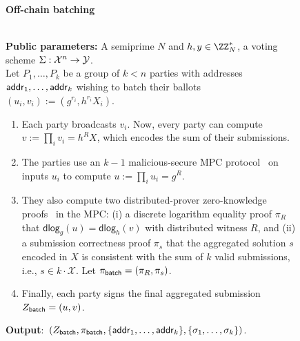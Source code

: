 \begin{figure}
    \centering
    \begin{mdframed}
    \begin{center}
        \textbf{Off-chain batching}
    \end{center}
    \hfill\\
    \textbf{Public parameters:} A semiprime $N$ and $h, y \in \ZZ_N^*$, a voting scheme $\Sigma : \mathcal{X}^n \rightarrow \mathcal{Y}$. \hfill\\
    \newline
    Let $P_1, \dots, P_{k}$ be a group of $k < n$ parties with addresses ${\sf addr}_1, \dots, {\sf addr}_{k}$ wishing to batch their ballots $(u_i, v_i) := (g^{r_i}, h^{r_i} X_i)$.
    \begin{enumerate}
        \item Each party broadcasts $v_i$. Now, every party can compute $v := \prod_i v_i = h^R X$, which encodes the sum of their submissions.
        \item The parties use an $k-1$ malicious-secure MPC protocol~\cite{ESORICS:DKLPSS13,CCS:Keller20} on inputs $u_i$ to compute $u := \prod_i u_i = g^R$.
        \item They also compute two distributed-prover zero-knowledge proofs~\cite{PoPETS:DPPSV22} in the MPC: (i) a discrete logarithm equality proof $\pi_R$ that $\mathsf{dlog}_g(u) = \mathsf{dlog}_h(v)$ with distributed witness $R$, and (ii) a submission correctness proof $\pi_s$ that the aggregated solution $s$ encoded in $X$ is consistent with the sum of $k$ valid submissions, i.e., $s\in k \cdot \mathcal{X}$. Let $\pi_{\sf batch} = (\pi_R, \pi_s)$.
        \item Finally, each party signs the final aggregated submission $Z_{\sf batch} = (u,v)$.
    \end{enumerate}
    \textbf{Output}:~$(Z_{\sf batch},\pi_{\sf batch}, \{{\sf addr}_1, \dots, {\sf addr}_{k}\}, \{\sigma_1, \dots, \sigma_{k}\})$.
    

\end{mdframed}
\end{figure}
